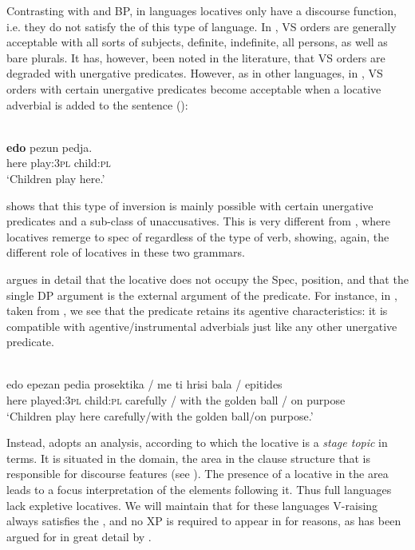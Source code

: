 \documentclass[output=paper]{LSP/langsci}
\begin{document}
Contrasting with  and BP, in  languages locatives only have a discourse function, i.e. they do not satisfy the  of this type of language. In , VS orders are generally acceptable with all sorts of subjects, definite, indefinite, all persons, as well as bare plurals. It has, however, been noted in the literature, that VS orders are degraded with unergative predicates. However, as in other  languages, in , VS orders with certain unergative predicates become acceptable when a locative adverbial is added to the sentence (\citealt{Torrego1989,Rigau1997,Borer2005,Alexiadou2010}):


\ea\label{ex:30.alexiadou}
\\
\gll \textbf{edo} pezun pedja.\\
 here play:3\textsc{pl} child:\textsc{pl}\\
\glt ‘Children play here.’
\z

\citet{Alexiadou2010} shows that this type of inversion is mainly possible with certain unergative predicates and a sub-class of unaccusatives. This is very different from , where locatives remerge to spec of  regardless of the type of verb, showing, again, the different role of locatives in these two grammars.

\citet{Alexiadou2010} argues in detail that the locative does not occupy the Spec, position, and that the single DP argument is the external argument of the predicate. For instance, in , taken from \citet{Alexiadou2010}, we see that the predicate retains its agentive characteristics: it is compatible with agentive/instrumental adverbials just like any other unergative predicate.


\ea\label{ex:31.alexiadou}
\\
\gll edo epezan pedia prosektika / me ti hrisi bala / epitides\\
 here played:3\textsc{pl} child:\textsc{pl} carefully / with the golden ball / {on purpose}\\
\glt ‘Children play here carefully/with the golden ball/on purpose.’
\z


Instead, \citet{Alexiadou2010} adopts an analysis, according to which the locative is a \textit{stage topic} in  terms. It is situated in the  domain, the area in the clause structure that is responsible for discourse features (see \citealt{Rizzi1997}). The presence of a locative in the  area leads to a focus interpretation of the elements following it. Thus full  languages lack expletive locatives. We will maintain that for these languages V-raising always satisfies the , and no XP is required to appear in  for  reasons, as has been argued for in great detail by \citet{AlexiadouAnagnostopoulou1998}.
\end{document}
